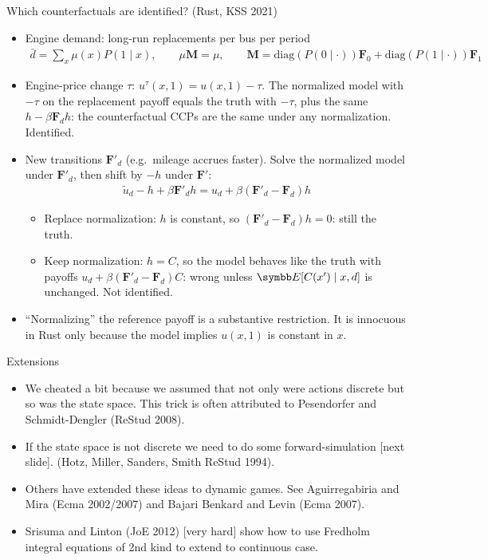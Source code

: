 \documentclass[aspectratio=169,11pt]{beamer}
\begin{document}
\begin{frame}{Which counterfactuals are identified? (Rust, KSS 2021)}
\footnotesize
\begin{itemize}
\item \alert{Engine demand}: long-run replacements per bus per period
\begin{align*}
\bar d = \sum_x \mu(x) P(1 \mid x), \qquad \mu \symbf{M} = \mu, \qquad \symbf{M} = \mathrm{diag}\left(P(0\mid\cdot)\right)\symbf{F}_0 + \mathrm{diag}\left(P(1\mid\cdot)\right)\symbf{F}_1
\end{align*}
\item \alert{Engine-price change} $\tau$: $u^\tau(x,1) = u(x,1) - \tau$. The normalized model with $-\tau$ on the replacement payoff equals the truth with $-\tau$, plus the same $h - \beta\symbf{F}_d h$: the counterfactual CCPs are the same under any normalization. \alert{Identified.}
\item \alert{New transitions} $\symbf{F}'_d$ (e.g.\ mileage accrues faster). Solve the normalized model under $\symbf{F}'_d$, then shift by $-h$ under $\symbf{F}'$:
\begin{align*}
\tilde u_d - h + \beta \symbf{F}'_d h = u_d + \beta \left(\symbf{F}'_d - \symbf{F}_d\right) h
\end{align*}
\begin{itemize}
\item Replace normalization: $h$ is constant, so $(\symbf{F}'_d - \symbf{F}_d) h = 0$: still the truth.
\item Keep normalization: $h = C$, so the model behaves like the truth with payoffs $u_d + \beta(\symbf{F}'_d - \symbf{F}_d) C$: wrong unless $\E[C(x') \mid x, d]$ is unchanged. \alert{Not identified.}
\end{itemize}
\item ``Normalizing'' the reference payoff is a substantive restriction. It is innocuous in Rust only because the model implies $u(x,1)$ is constant in $x$.
\end{itemize}
\end{frame}

\begin{frame}{Extensions}
\begin{itemize}
\item We cheated a bit because we assumed that not only were actions discrete but so was the state space. This trick is often attributed to Pesendorfer and Schmidt-Dengler (ReStud 2008).
\item If the state space is not discrete we need to do some forward-simulation [next slide]. (Hotz, Miller, Sanders, Smith ReStud 1994).
\item Others have extended these ideas to \alert{dynamic games}. See Aguirregabiria and Mira (Ecma 2002/2007) and Bajari Benkard and Levin (Ecma 2007).
\item Srisuma and Linton (JoE 2012) [very hard] show how to use Fredholm integral equations of 2nd kind to extend to continuous case.
\end{itemize}
\end{frame}
\end{document}
